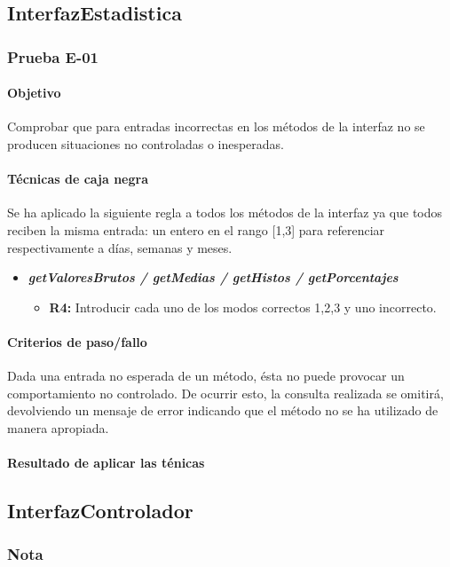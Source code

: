 \documentclass[10pt,a4paper]{article}
\begin{document}
	\subsection{InterfazEstadistica}
			\subsubsection{Prueba E-01}
			\paragraph{Objetivo} Comprobar que para entradas incorrectas en los métodos de la interfaz no se producen situaciones no controladas o inesperadas.
			\paragraph{Técnicas de caja negra} Se ha aplicado la siguiente regla a todos los métodos de la interfaz ya que todos reciben la misma entrada: un entero en el rango [1,3] para referenciar respectivamente a días, semanas y meses.
			\begin{itemize}
				\item \textbf{\textit{getValoresBrutos / getMedias / getHistos / getPorcentajes}}
					\begin{itemize}
						\item \textbf{R4:} Introducir cada uno de los modos correctos {1,2,3} y uno incorrecto.
					\end{itemize}
			\end{itemize}
			\paragraph{Criterios de paso/fallo} Dada una entrada no esperada de un método, ésta no puede provocar un comportamiento no controlado. De ocurrir esto, la consulta realizada se omitirá, devolviendo un mensaje de error indicando que el método no se ha utilizado de manera apropiada.
			\paragraph{Resultado de aplicar las ténicas}
	\subsection{InterfazControlador}
			\subsubsection{Nota}
\end{document}
